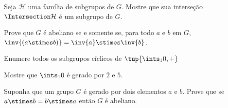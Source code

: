 \begin{exercise}
	Seja $\mathcal{H}$ uma família de subgrupos de $G$. Mostre que sua interseção $\Intersection \mathcal{H}$ é um subgrupo de $G$.
\end{exercise}

\begin{exercise}
	Prove que $G$ é abeliano se e somente se, para todo $a$ e $b$ em $G$, $\inv{(a \stimes b)} = \inv{a} \stimes \inv{b}$.
\end{exercise}

\begin{exercise}
	Enumere todos os subgrupos cíclicos de $\tup{\ints_10, +}$
\end{exercise}

\begin{exercise}
	Mostre que $\ints_10$ é gerado por $2$ e $5$.
\end{exercise}

\begin{exercise}
	Suponha que um grupo $G$ é gerado por dois elementos $a$ e $b$.
	Prove que se $a \stimes b = b \stimes a$ então $G$ é abeliano.	
\end{exercise}